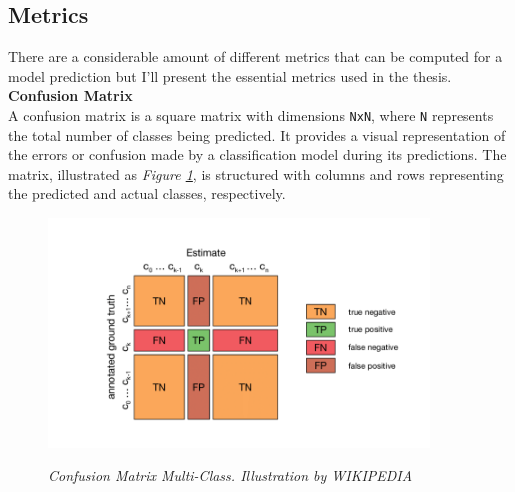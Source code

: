 \newpage

\subsection{Metrics}
{\label{sec:metrics}}

There are a considerable amount of different metrics that can be computed for a model prediction but I'll present the essential metrics used in the thesis. \\

\vspace{0.5cm}
\textbf{Confusion Matrix} \\

\noindent A confusion matrix is a square matrix with dimensions {\tt NxN}, where {\tt N} represents the total number of classes being predicted. It provides a visual representation of the errors or confusion made by a classification model during its predictions. The matrix, illustrated as \textit{Figure \ref{fig:confusion-matrix}}, is structured with columns and rows representing the predicted and actual classes, respectively.

\begin{figure}[H]
\begin{adjustbox}{trim={0pt 0.5cm 0pt 1cm}, clip}
\centering
\includegraphics[width=0.9\textwidth]{imatges/preliminaries/confusion-matrix.png}
\end{adjustbox}
\caption[Confusion Matrix Multi-Class]{\textit{Confusion Matrix Multi-Class. Illustration by WIKIPEDIA}}
{\label{fig:confusion-matrix}}
\end{figure}

